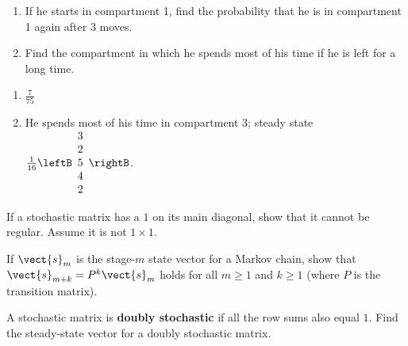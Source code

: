 \begin{multicols}{2}
\begin{ex}
\begin{figure}[H]
\centering

\end{figure}

\begin{enumerate}[label={\alph*.}]
\item If he starts in compartment 1, find the probability that he is in compartment 1 again after $3$ moves.

\item Find the compartment in which he spends most of his time if he is left for a long time.

\end{enumerate}
\begin{sol}
\begin{enumerate}[label={\alph*.}]
\item $\frac{7}{75}$

\item  He spends most of his time in compartment 3; steady state $\frac{1}{16} \leftB \begin{array}{r}
3 \\
2 \\
5 \\
4 \\
2
\end{array} \rightB$.

\end{enumerate}
\end{sol}
\end{ex}


\begin{ex}
If a stochastic matrix has a $1$ on its main diagonal, show that it cannot be regular. Assume it is not $1 \times 1$.
\end{ex}

\begin{ex}
If $\vect{s}_{m}$ is the stage-$m$ state vector for a Markov chain, show that $\vect{s}_{m+k} = P^{k}\vect{s}_{m}$ holds for all $m \geq 1$ and $k \geq 1$ (where $P$ is the transition matrix).
\end{ex}

\begin{ex}
A stochastic matrix is \textbf{doubly stochastic} if all the row sums also equal $1$. Find the steady-state vector for a doubly stochastic matrix.
\end{ex}


\end{multicols}
